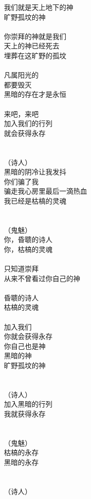 我们就是天上地下的神\\
旷野孤坟的神\\
\\
你崇拜的神就是我们\\
天上的神已经死去\\
埋葬在这旷野的孤坟\\
\\
凡属阳光的\\
都要毁灭\\
黑暗的存在才是永恒\\
\\
来吧，来吧\\
加入我们的行列\\
就会获得永存\\
\\
\\
（诗人）\\
黑暗的阴冷让我发抖\\
你们骗了我\\
骗走我心房里最后一滴热血\\
我已经是枯槁的灵魂\\
\\
\\
（鬼魅）\\
你，昏聩的诗人\\
你，枯槁的灵魂\\
\\
只知道崇拜\\
从来不曾看过你自己的神\\
\\
昏聩的诗人\\
枯槁的灵魂\\
\\
加入我们\\
你就会获得永存\\
你自己也是神\\
黑暗的神\\
旷野孤坟的神\\
\\
\\
（诗人）\\
加入黑暗的行列\\
我就获得永存\\
\\
\\
（鬼魅）\\
枯槁的永存\\
黑暗的永存\\
\\
\\
（诗人）\\

